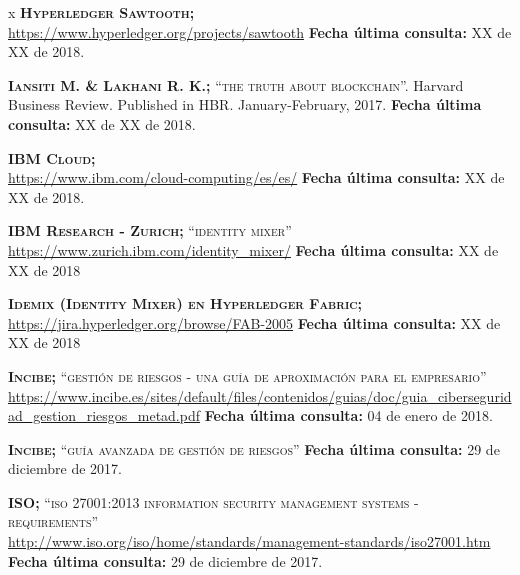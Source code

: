 \begin{thebibliography} {x}
	 \textsc{\textbf{Hyperledger Sawtooth; }} \\ 
	\url{https://www.hyperledger.org/projects/sawtooth} 
	\newline \textbf{Fecha última consulta:} {\color{red}XX de XX de 2018.}	
				
	 \textsc{\textbf{Iansiti M. \& Lakhani R. K.; }}\textsc{“the truth about blockchain”.} Harvard Business Review. Published in HBR. January-February, 2017. 
	\newline \textbf{Fecha última consulta:} {\color{red}XX de XX de 2018.}
	
	 \textsc{\textbf{IBM Cloud; }} \\ 
	\url{https://www.ibm.com/cloud-computing/es/es/} 
	\newline \textbf{Fecha última consulta:} {\color{red}XX de XX de 2018.}
		
	\textsc{\textbf{IBM Research - Zurich; }} \textsc{“identity mixer”} \\
	\url{https://www.zurich.ibm.com/identity_mixer/} 
	\newline \textbf{Fecha última consulta:} XX de XX de 2018
	
	 \textsc{\textbf{Idemix (Identity Mixer) en Hyperledger Fabric; }} \\ 
	\url{https://jira.hyperledger.org/browse/FAB-2005} 
	\newline \textbf{Fecha última consulta:} XX de XX de 2018
		
	 \textsc{\textbf{Incibe; }}\textsc{“gestión de riesgos - una guía de aproximación para el empresario”} \\
	\url{https://www.incibe.es/sites/default/files/contenidos/guias/doc/guia_ciberseguridad_gestion_riesgos_metad.pdf}
	\newline \textbf{Fecha última consulta:} 04 de enero de 2018.
		
	 \textsc{\textbf{Incibe; }}\textsc{“guía avanzada de gestión de riesgos”}
	\newline \textbf{Fecha última consulta:} 29 de diciembre de 2017.
		
	 \textsc{\textbf{ISO; }}\textsc{“iso 27001:2013 information security management systems - requirements”} \\
	\url{http://www.iso.org/iso/home/standards/management-standards/iso27001.htm}
	\newline \textbf{Fecha última consulta:} 29 de diciembre de 2017.
		

\end{thebibliography}
